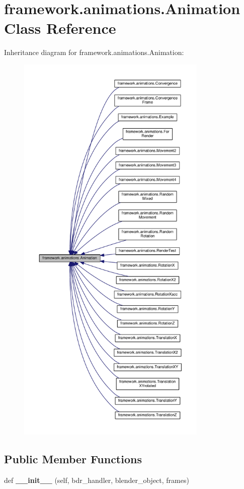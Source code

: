 \hypertarget{classframework_1_1animations_1_1Animation}{}\section{framework.\+animations.\+Animation Class Reference}
\label{classframework_1_1animations_1_1Animation}


Inheritance diagram for framework.\+animations.\+Animation\+:
\nopagebreak
\begin{figure}[H]
\begin{center}
\leavevmode
\includegraphics[height=550pt]{classframework_1_1animations_1_1Animation__inherit__graph}
\end{center}
\end{figure}
\subsection*{Public Member Functions}
\begin{DoxyCompactItemize}
\item 
def {\bfseries \+\_\+\+\_\+init\+\_\+\+\_\+} (self, bdr\+\_\+handler, blender\+\_\+object, frames)\hypertarget{classframework_1_1animations_1_1Animation_a79a2452ea3187f3364c204cded7c1d01}{}\label{classframework_1_1animations_1_1Animation_a79a2452ea3187f3364c204cded7c1d01}

\end{DoxyCompactItemize}
